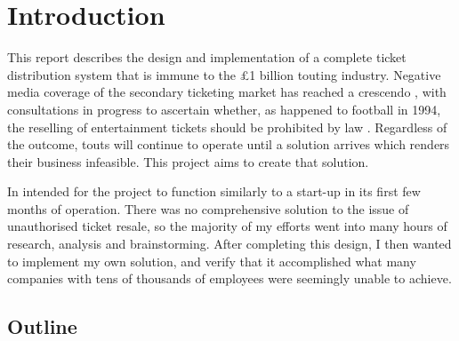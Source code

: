\documentclass[12pt,a4paper]{bhamdissertation}
\begin{document}
\chapter{Introduction}

This report describes the design and implementation of a complete ticket distribution system that is immune to the £1 billion \cite{MF16} touting industry. Negative media coverage of the secondary ticketing market has reached a crescendo \cite{JR16}, with consultations in progress to ascertain whether, as happened to football in 1994, the reselling of entertainment tickets should be prohibited by law \cite{H15}. Regardless of the outcome, touts will continue to operate until a solution arrives which renders their business infeasible. This project aims to create that solution.

In intended for the project to function similarly to a start-up in its first few months of operation. There was no comprehensive solution to the issue of unauthorised ticket resale, so the majority of my efforts went into many hours of research, analysis and brainstorming. After completing this design, I then wanted to implement my own solution, and verify that it accomplished what many companies with tens of thousands of employees were seemingly unable to achieve.

\section{Outline}
\end{document}
